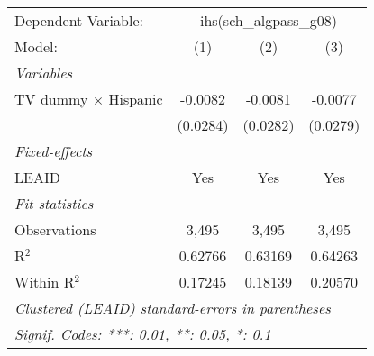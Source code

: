 \begin{tabular}{lccc}
\tabularnewline\midrule\midrule
Dependent Variable:&\multicolumn{3}{c}{ihs(sch\_algpass\_g08)}\\
Model:&(1) & (2) & (3)\\
\midrule \emph{Variables}&   &   &  \\
TV dummy $\times$ Hispanic & -0.0082 & -0.0081 & -0.0077\\
  &(0.0284) & (0.0282) & (0.0279)\\
\midrule \emph{Fixed-effects}&   &   &  \\
LEAID & Yes & Yes & Yes\\
\midrule \emph{Fit statistics}&  & & \\
Observations & 3,495&3,495&3,495\\
R$^2$ & 0.62766&0.63169&0.64263\\
Within R$^2$ & 0.17245&0.18139&0.20570\\
\midrule\midrule\multicolumn{4}{l}{\emph{Clustered (LEAID) standard-errors in parentheses}}\\
\multicolumn{4}{l}{\emph{Signif. Codes: ***: 0.01, **: 0.05, *: 0.1}}\\
\end{tabular}


